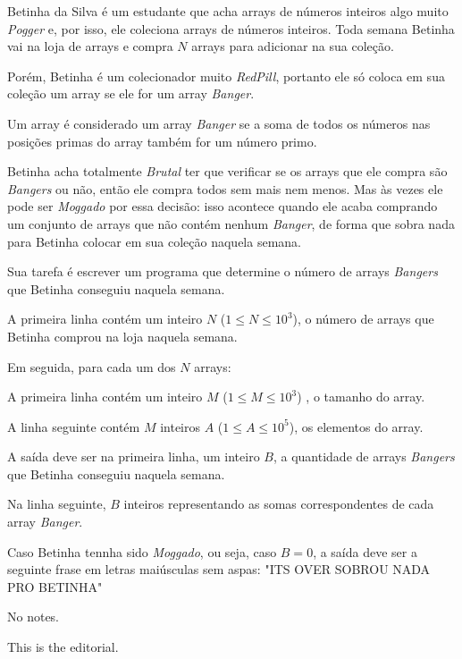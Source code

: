Betinha da Silva é um estudante que acha arrays de números inteiros algo muito \textit{Pogger} e, por isso, ele coleciona arrays de números inteiros.  
Toda semana Betinha vai na loja de arrays e compra $N$ arrays para adicionar na sua coleção.  

Porém, Betinha é um colecionador muito \textit{RedPill}, portanto ele só coloca em sua coleção um array se ele for um array \textit{Banger}.  

Um array é considerado um array \textit{Banger} se a soma de todos os números nas posições primas do array também for um número primo.  

Betinha acha totalmente \textit{Brutal} ter que verificar se os arrays que ele compra são \textit{Bangers} ou não, então ele compra todos sem mais nem menos.  
Mas às vezes ele pode ser \textit{Moggado} por essa decisão: isso acontece quando ele acaba comprando um conjunto de arrays que não contém nenhum \textit{Banger}, de forma que sobra nada para Betinha colocar em sua coleção naquela semana.  

Sua tarefa é escrever um programa que determine o número de arrays \textit{Bangers} que Betinha conseguiu naquela semana.

A primeira linha contém um inteiro $N$ ($1 \leq N \leq 10^3$), o número de arrays que Betinha comprou na loja naquela semana.  

Em seguida, para cada um dos $N$ arrays:  

A primeira linha contém um inteiro $M$ ($1 \leq M \leq 10^3$) , o tamanho do array.  

A linha seguinte contém $M$ inteiros $A$ ($1 \leq A \leq 10^5$), os elementos do array.  

A saída deve ser na primeira linha, um inteiro $B$, a quantidade de arrays \textit{Bangers} que Betinha conseguiu naquela semana.  

Na linha seguinte, $B$ inteiros representando as somas correspondentes de cada array \textit{Banger}.  

Caso Betinha tennha sido \textit{Moggado}, ou seja, caso $B = 0$, a saída deve ser a seguinte frase em letras maiúsculas sem aspas: "ITS OVER SOBROU NADA PRO BETINHA"

No notes.

This is the editorial.
